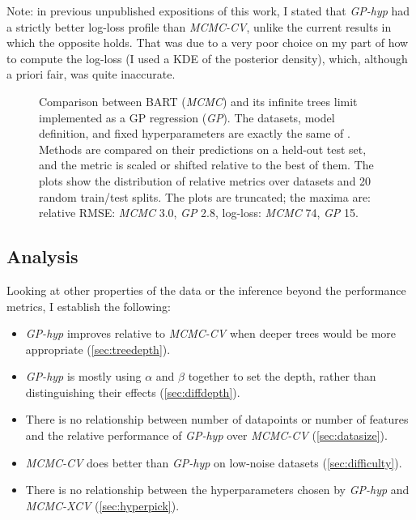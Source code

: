 \documentclass[a4paper]{article}
\theoremstyle{definition}
\newcommand{\widecenter}[1]{\noindent\hspace{-\textwidth}\makebox[3\textwidth][c]{#1}}
\newcommand{\includempl}[1]{\texttt{[image: \#1]}}
\begin{document}
    Note: in previous unpublished expositions of this work, I stated that \emph{GP-hyp} had a strictly better log-loss profile than \emph{MCMC-CV}, unlike the current results in which the opposite holds. That was due to a very poor choice on my part of how to compute the log-loss (I used a KDE of the posterior density), which, although a priori fair, was quite inaccurate.

    \begin{figure}
        
        \widecenter{\includempl{articleplot2}}
        
        \caption{\label{fig:comparison2} Comparison between BART (\emph{MCMC}) and its infinite trees limit implemented as a GP regression (\emph{GP}). The datasets, model definition, and fixed hyperparameters are exactly the same of \textcite{chipman2010}. Methods are compared on their predictions on a held-out test set, and the metric is scaled or shifted relative to the best of them. The plots show the distribution of relative metrics over datasets and 20 random train/test splits. The plots are truncated; the maxima are: relative RMSE: \emph{MCMC} 3.0, \emph{GP} 2.8, log-loss: \emph{MCMC} 74, \emph{GP} 15.}
        
    \end{figure}

    \subsection{Analysis}
    \label{sec:anal}

    Looking at other properties of the data or the inference beyond the performance metrics, I establish the following:
    \begin{itemize}
        
        \item \emph{GP-hyp} improves relative to \emph{MCMC-CV} when deeper trees would be more appropriate (\autoref{sec:treedepth}).
        
        \item \emph{GP-hyp} is mostly using $\alpha$ and $\beta$ together to set the depth, rather than distinguishing their effects (\autoref{sec:diffdepth}).
        
        \item There is no relationship between number of datapoints or number of features and the relative performance of \emph{GP-hyp} over \emph{MCMC-CV} (\autoref{sec:datasize}).
        
        \item \emph{MCMC-CV} does better than \emph{GP-hyp} on low-noise datasets (\autoref{sec:difficulty}).
        
        \item There is no relationship between the hyperparameters chosen by \emph{GP-hyp} and \emph{MCMC-XCV} (\autoref{sec:hyperpick}).
    
    \end{itemize}
\end{document}
